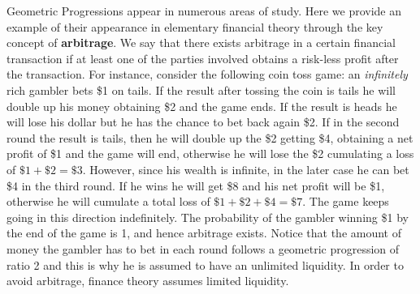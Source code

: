  Geometric Progressions appear in numerous areas of study. Here we provide an example of their appearance in elementary financial theory through the key concept of \textbf{arbitrage}. We say that there exists arbitrage in a certain financial transaction if at least one of the parties involved obtains a risk-less profit after the transaction. For instance, consider the following coin toss game: an \emph{infinitely} rich gambler bets \$1 on tails. If the result after tossing the coin is tails he will double up his money obtaining \$2 and the game ends. If the result is heads he will lose his dollar but he has the chance to bet back again \$2. If in the second round the result is tails, then he will double up the \$2 getting \$4, obtaining a net profit of \$1 and the game will end, otherwise he will lose the \$2 cumulating a loss of $\$1+\$2=\$3$. However, since his wealth is infinite, in the later case he can bet \$4 in the third round. If he wins he will get \$8 and his net profit will be \$1, otherwise he will cumulate a total loss of $\$1+\$2+\$4=\$7$. The game keeps going in this direction indefinitely. The probability of the gambler winning \$1 by the end of the game is 1, and hence arbitrage exists. Notice that the amount of money the gambler has to bet in each round follows a geometric progression of ratio 2 and this is why he is assumed to have an unlimited liquidity. In order to avoid arbitrage, finance theory assumes limited liquidity. \\

 \vspace{0.2cm}


